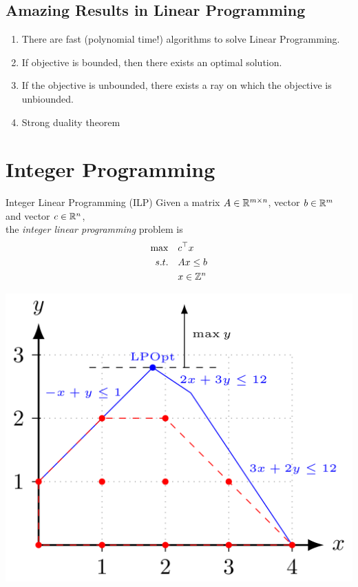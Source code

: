 \documentclass{article}
\begin{document}
\subsection{Amazing Results in Linear Programming}

\begin{enumerate}
\item There are fast (polynomial time!) algorithms to solve Linear Programming.
\item If objective is bounded, then there exists an optimal solution.
\item If the objective is unbounded, there exists a ray on which the objective is unbiounded.
\item Strong duality theorem
\end{enumerate}
\newpage
\section{Integer Programming}
\begin{minipage}{0.5\textwidth}
\begin{general}{Integer Linear Programming (ILP)}{\npcomplete}
Given a matrix $A \in \mathbb{R}^{m\times n}$, vector $b \in \mathbb{R}^m$\\
 and vector $c \in \mathbb{R}^n$, \\
the \emph{integer linear programming} problem is
\begin{equation}
\label{eq:ILP}
\begin{split}
\max \quad & c^\top x\\
s.t.  \quad & Ax \leq b\\
& x \in {\mathbb{Z}}^n
\end{split}
\end{equation}
\end{general}
\end{minipage}
\begin{minipage}{0.5\textwidth}
\begin{center}
\includegraphics[scale = 0.18]{optimization/figures/figures-static/wiki/File/integer-programming.png}
\end{center}
\end{minipage}
\end{document}
